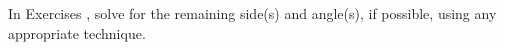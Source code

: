 {\noindent In Exercises}
{, solve for the remaining side(s) and angle(s), if possible, using any appropriate technique.}
